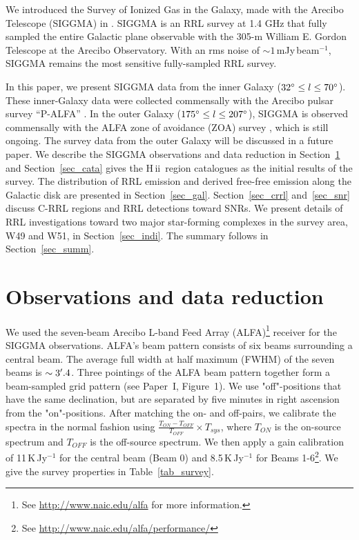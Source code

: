\documentclass[manuscript]{aastex61}
\newcommand{\hii}{{\rm H\,}{{\sc ii}}}
\begin{document}
We introduced the Survey of Ionized Gas in the Galaxy, made with the Arecibo Telescope (SIGGMA) in \citet[hereafter ``Paper I'']{Liu2013}.
SIGGMA is an RRL survey at 1.4 GHz that fully sampled the entire Galactic plane observable with the 305-m William E. Gordon Telescope at the Arecibo Observatory.
With an rms noise of $\sim1$\,mJy\,beam$^{-1}$, SIGGMA remains the most sensitive fully-sampled RRL survey.

In this paper, we present SIGGMA data from the inner Galaxy ($32 \mbox{$^\circ$} \leq l \leq 70 \mbox{$^\circ$}$).
These inner-Galaxy data were collected commensally with the Arecibo pulsar survey ``P-ALFA'' \citep{Cordes2006, Lazarus2015}.
In the outer Galaxy ($175 \mbox{$^\circ$} \leq l \leq 207 \mbox{$^\circ$} $), SIGGMA is observed commensally with the ALFA zone of avoidance (ZOA) survey \citep[][]{McIntyre2015}, which is still ongoing.
The survey data from the outer Galaxy will be discussed in a future paper. 
We describe the SIGGMA observations and data reduction in Section~\ref{sec_obs_data} and Section~\ref{sec_cata} gives the \hii\ region catalogues as the initial results of the survey. 
The distribution of RRL emission and derived free-free emission along the Galactic disk are presented in Section~\ref{sec_gal}.
Section~\ref{sec_crrl} and~\ref{sec_snr} discuss C-RRL regions and RRL detections toward SNRs.
We present details of RRL investigations toward two major star-forming complexes in the survey area, W49 and W51, in Section~\ref{sec_indi}.
The summary follows in Section~\ref{sec_summ}.

\section{Observations and data reduction} \label{sec_obs_data}

We used the seven-beam Arecibo L-band Feed Array (ALFA)\footnote{See \url{http://www.naic.edu/alfa} for more information.} receiver for the SIGGMA observations.
ALFA's beam pattern consists of six beams surrounding a central beam.
The average full width at half maximum (FWHM) of the seven beams is $\sim3\mbox{$^\prime$}.4$.
Three pointings of the ALFA beam pattern together form a beam-sampled grid pattern (see Paper~I, Figure~1).
We use "off"-positions that have the same declination, but are separated by five minutes in right ascension from the "on"-positions.
After matching the on- and off-pairs, we calibrate the spectra in the normal fashion using $\frac{T_{ON}-T_{OFF}}{T_{OFF}}\times T_{sys}$, where $T_{ON}$ is the on-source spectrum and $T_{OFF}$ is the off-source spectrum.
We then apply a gain calibration of 11\,K\,Jy$^{-1}$ for the central beam (Beam 0) and 8.5\,K\,Jy$^{-1}$ for Beams 1-6\footnote{See \url{http://www.naic.edu/alfa/performance/}}.
We give the survey properties in Table~\ref{tab_survey}.
\end{document}

